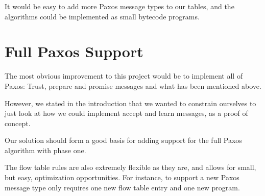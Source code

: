It would be easy to add more Paxos message types to our tables, and the
algorithms could be implemented as small bytecode programs.

\section{Full Paxos Support}

The most obvious improvement to this project would be to implement all of
Paxos: Trust, prepare and
promise messages and what has been mentioned above.

However, we stated in the introduction that we wanted to constrain ourselves
to just look at how we could implement accept and learn messages, as a
proof of concept.

Our solution should form a good basis for adding support for the full Paxos
algorithm with phase one.

The flow table rules are also extremely flexible as they are, and allows for
small, but easy, optimization opportunities.
%
For instance, to support a new
Paxos message type only requires one new flow table entry and one new
program.

